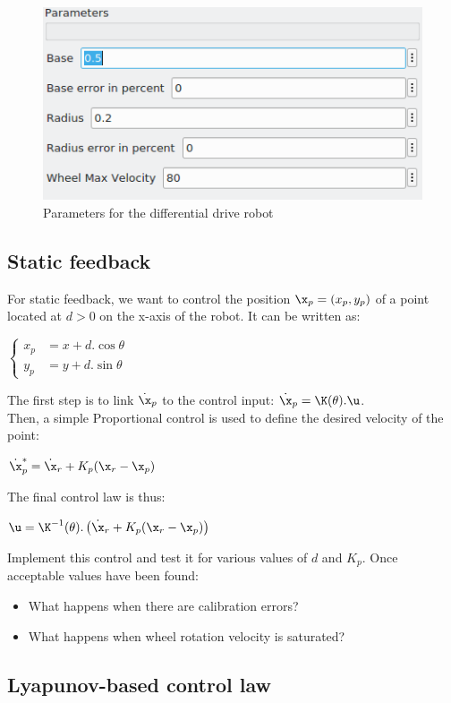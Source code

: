 \documentclass{ecnreport}
\begin{document}
\begin{figure}[ht]
\centering
\includegraphics[width=0.4\linewidth]{param20}
\caption{Parameters for the differential drive robot}
\end{figure}

\subsection{Static feedback}

For static feedback, we want to control the position $\x_p = (x_p,y_p)$ of a point located at $d > 0$ on the x-axis of the robot.
It can be written as: 
\begin{center}
 $\left\{\begin{array}{ll}
         x_p &= x + d.\cos\theta \\
         y_p &= y + d.\sin\theta 
        \end{array}\right.$
\end{center}
The first step is to link $\dot \x_p$ to the control input: $\dot \x_p = \K(\theta).\u$.
\\

Then, a simple Proportional control is used to define the desired velocity of the point:
\begin{center}
$\dot \x_p^* = \dot \x_r + K_p(\x_r - \x_p)$
\end{center}
The final control law is thus:
\begin{center}
$\u = \K^{-1}(\theta) .\left(\dot \x_r + K_p(\x_r - \x_p)\right)$
\end{center}

Implement this control and test it for various values of $d$ and $K_p$. Once acceptable values have been found:
\begin{itemize}
 \item What happens when there are calibration errors?
 \item What happens when wheel rotation velocity is saturated?
\end{itemize} 

\subsection{Lyapunov-based control law}
\end{document}

